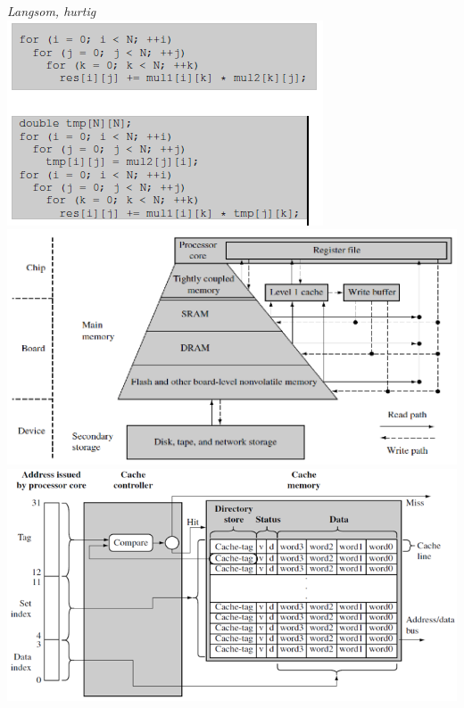 \documentclass{paper}
\begin{document}
\textit{Langsom, hurtig\\}
\includegraphics[scale=0.7]{matrix.png}
\\
\includegraphics[scale=0.7]{cache.png}
\\
\includegraphics[scale=0.7]{cachecontroller.png}
\end{document}
